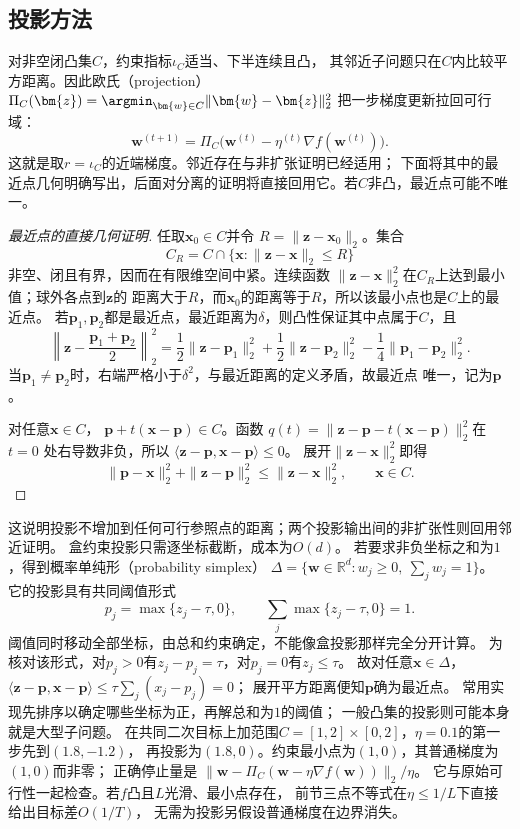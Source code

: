 \subsection{投影方法}
\label{sec:opt-projected-methods}

对非空闭凸集$C$，约束指标$\iota_C$适当、下半连续且凸，
其邻近子问题只在$C$内比较平方距离。因此欧氏（projection）
$\Pi_C(\bm{z})=\argmin_{\bm{w}\in C}\lVert\bm{w}-\bm{z}\rVert_2^2$
把一步梯度更新拉回可行域：
\[
  \bm{w}^{(t+1)}
  =\Pi_C\bigl(\bm{w}^{(t)}-\eta^{(t)}\nabla f(\bm{w}^{(t)})\bigr).
\]
这就是取$r=\iota_C$的近端梯度。邻近存在与非扩张证明已经适用；
下面将其中的最近点几何明确写出，后面对分离的证明将直接回用它。若$C$非凸，最近点可能不唯一。

\begin{proof}[最近点的直接几何证明]
任取$\bm{x}_0\in C$并令
$R=\lVert\bm{z}-\bm{x}_0\rVert_2$。集合
\[
  C_R=C\cap\{\bm{x}:\lVert\bm{z}-\bm{x}\rVert_2\leq R\}
\]
非空、闭且有界，因而在有限维空间中紧。连续函数
$\lVert\bm{z}-\bm{x}\rVert_2^2$在$C_R$上达到最小值；球外各点到$\bm{z}$的
距离大于$R$，而$\bm{x}_0$的距离等于$R$，所以该最小点也是$C$上的最近点。
若$\bm{p}_1,\bm{p}_2$都是最近点，最近距离为$\delta$，则凸性保证其中点属于$C$，且
\[
  \left\lVert\bm{z}-\frac{\bm{p}_1+\bm{p}_2}{2}\right\rVert_2^2
  =
  \frac12\lVert\bm{z}-\bm{p}_1\rVert_2^2
  +\frac12\lVert\bm{z}-\bm{p}_2\rVert_2^2
  -\frac14\lVert\bm{p}_1-\bm{p}_2\rVert_2^2.
\]
当$\bm{p}_1\neq\bm{p}_2$时，右端严格小于$\delta^2$，与最近距离的定义矛盾，故最近点
唯一，记为$\bm{p}$。

对任意$\bm{x}\in C$，
$\bm{p}+t(\bm{x}-\bm{p})\in C$。函数
$q(t)=\lVert\bm{z}-\bm{p}-t(\bm{x}-\bm{p})\rVert_2^2$在$t=0$
处右导数非负，所以
$\langle\bm{z}-\bm{p},\bm{x}-\bm{p}\rangle\leq0$。
展开$\|\bm z-\bm x\|_2^2$即得
\begin{equation}
 \|\bm p-\bm x\|_2^2+\|\bm z-\bm p\|_2^2\leq\|\bm z-\bm x\|_2^2,
 \qquad \bm x\in C.
 \label{eq:opt-projection-distance}
\end{equation}
\end{proof}

这说明投影不增加到任何可行参照点的距离；两个投影输出间的非扩张性则回用邻近证明。
盒约束投影只需逐坐标截断，成本为$O(d)$。
若要求非负坐标之和为$1$，得到概率单纯形（probability simplex）
$\Delta=\{\bm w\in\mathbb R^d:w_j\geq0,\ \sum_jw_j=1\}$。
它的投影具有共同阈值形式
\[
 p_j=\max\{z_j-\tau,0\},\qquad
 \sum_j\max\{z_j-\tau,0\}=1.
\]
阈值同时移动全部坐标，由总和约束确定，不能像盒投影那样完全分开计算。
为核对该形式，对$p_j>0$有$z_j-p_j=\tau$，对$p_j=0$有$z_j\leq\tau$。
故对任意$\bm x\in\Delta$，
$\langle\bm z-\bm p,\bm x-\bm p\rangle
\leq\tau\sum_j(x_j-p_j)=0$；
展开平方距离便知$\bm p$确为最近点。
常用实现先排序以确定哪些坐标为正，再解总和为$1$的阈值；
一般凸集的投影则可能本身就是大型子问题。
在共同二次目标上加范围$C=[1,2]\times[0,2]$，$\eta=0.1$的第一步先到$(1.8,-1.2)$，
再投影为$(1.8,0)$。约束最小点为$(1,0)$，其普通梯度为$(1,0)$而非零；
正确停止量是
$\|\bm w-\Pi_C(\bm w-\eta\nabla f(\bm w))\|_2/\eta$。
它与原始可行性一起检查。若$f$凸且$L$光滑、最小点存在，
前节三点不等式在$\eta\leq1/L$下直接给出目标差$O(1/T)$，
无需为投影另假设普通梯度在边界消失。

